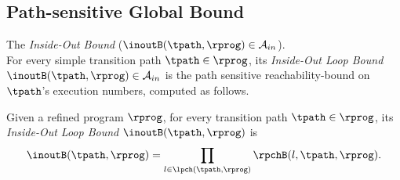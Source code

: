 \subsection{Path-sensitive Global Bound}

The \emph{Inside-Out Bound} ($\inoutB(\tpath, \rprog) \in \mathcal{A}_{in}$).
\\
For every simple transition path $\tpath \in \rprog$,
its \emph{Inside-Out Loop Bound}
 $\inoutB(\tpath, \rprog) \in \mathcal{A}_{in}$ is 
the path sensitive reachability-bound on $\tpath$'s execution numbers,
computed as follows.
\begin{defn}
  \label{def:outin_bound}
  Given a refined program $\rprog$, for every transition path $\tpath \in \rprog$, 
  its \emph{Inside-Out Loop Bound}
  $\inoutB(\tpath, \rprog)$ is 
\[
  \inoutB(\tpath, \rprog) =
  \prod\limits_{l \in \lpch(\tpath, \rprog)} \rpchB(l, \tpath, \rprog).
\]
\end{defn}

